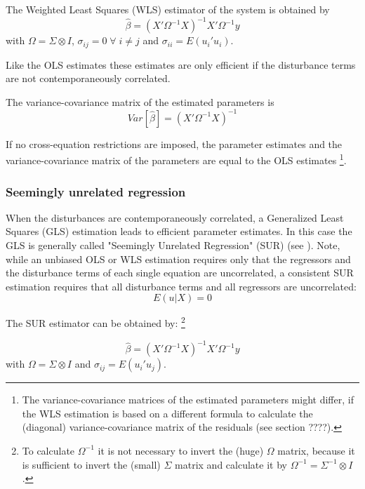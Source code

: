 \documentclass[article]{jss}
\begin{document}
The Weighted Least Squares (WLS) estimator of the system 
is obtained by
\begin{equation}
   \widehat{\beta} = \left( X' \Omega^{-1} X \right)^{-1} X' \Omega^{-1} y
\end{equation}
with $\Omega = \Sigma \otimes I$, 
$\sigma_{ij} = 0 \; \forall \; i \neq j$ and
$\sigma_{ii} = E \left( u_i' u_i \right)$.

Like the OLS estimates these estimates are only efficient 
if the disturbance terms are not contemporaneously correlated.

The variance-covariance matrix of the estimated parameters is
\begin{equation}
   Var \left[ \widehat{\beta} \right] = \left( X' \Omega^{-1} X \right)^{-1}
\end{equation}

If no cross-equation restrictions are imposed, 
the parameter estimates and the variance-covariance matrix 
of the parameters are equal to the OLS estimates%
\footnote{The variance-covariance matrices of the 
estimated parameters might differ, 
if the WLS estimation is based on a different formula 
to calculate the (diagonal) variance-covariance 
matrix of the residuals (see section ????).}.  

\subsubsection{Seemingly unrelated regression}

When the disturbances are contemporaneously correlated, a Generalized 
Least Squares (GLS) estimation leads to efficient parameter estimates.
In this case the GLS is generally called "Seemingly Unrelated Regression" 
(SUR) (see \citealp{zellner62}). 
Note, while an unbiased OLS or WLS estimation requires only that 
the regressors and the disturbance terms of each single 
equation are uncorrelated,
a consistent SUR estimation requires that all disturbance terms and all 
regressors are uncorrelated:
\begin{equation}
   E \left( u | X \right) = 0
\end{equation}

The SUR estimator can be obtained by:%
\footnote{To calculate $\Omega^{-1}$ it is not necessary to invert 
the (huge) $\Omega$ matrix, 
because it is sufficient to invert the (small) $\Sigma$ matrix and
calculate it by $\Omega^{-1} = \Sigma^{-1} \otimes I$.}

\begin{equation}
   \widehat{\beta} = \left( X' \Omega^{-1} X \right)^{-1} X' \Omega^{-1} y
\end{equation}
with $\Omega = \Sigma \otimes I$ and
$\sigma_{ij} = E \left( u_i' u_j \right)$.
\end{document}
